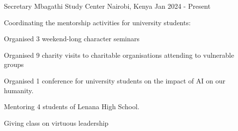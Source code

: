 \begin{cventries}
  \cventry
    {Secretary} %
    {Mbagathi Study Center} %
    {Nairobi, Kenya} %
    {Jan 2024 - Present} %
    {
      \begin{cvitems} %
        \item {Coordinating the mentorship activities for university students:}
        \item Organised 3 weekend-long character seminars
        \item Organised 9 charity visits to charitable organisations attending to vulnerable groups
        \item Organised 1 conference for university students on the impact of AI on our humanity.
        \item {Mentoring 4 students of Lenana High School.}
        \item {Giving class on virtuous leadership}
      \end{cvitems}
    }
    
\end{cventries}
